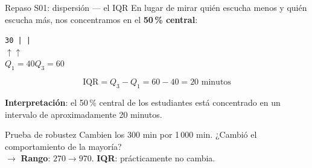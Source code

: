 \documentclass[aspectratio=169, 11pt]{beamer}
\begin{document}
\begin{frame}{Repaso S01: dispersi\'on --- el IQR}
En lugar de mirar qui\'en escucha menos y qui\'en escucha m\'as, nos concentramos en el \textbf{50\,\% central}:

\vspace{0.3em}
\begin{center}
\texttt{30\;\;\; |\;\;\;\;\;\;\; |\;\;}\\[4pt]
\hspace{2.2em}$\uparrow$\hspace{11.5em}$\uparrow$\\
\hspace{2.2em}$Q_1 = 40$\hspace{8.5em}$Q_3 = 60$
\end{center}

\[
\text{IQR} = Q_3 - Q_1 = 60 - 40 = 20 \text{ minutos}
\]

\textbf{Interpretaci\'on}: el 50\,\% central de los estudiantes est\'a concentrado en un intervalo de aproximadamente 20 minutos.

\vspace{0.5em}
\begin{alertblock}{Prueba de robustez}
Cambien los 300 min por 1\,000 min. ¿Cambi\'o el comportamiento de la mayor\'ia?\\
$\to$ \textbf{Rango}: $270 \to 970$. \quad \textbf{IQR}: pr\'acticamente no cambia.
\end{alertblock}
\end{frame}
\end{document}

